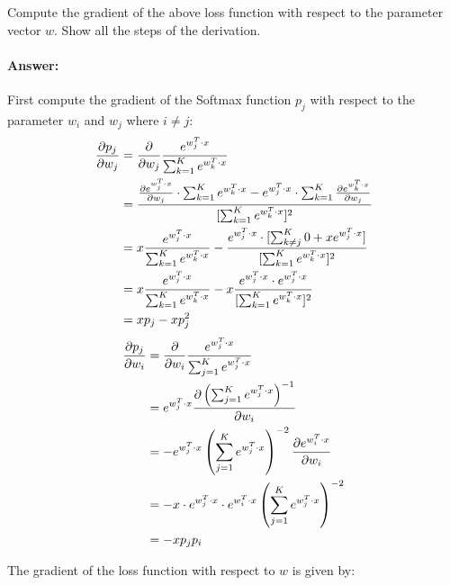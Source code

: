 \documentclass[10pt]{article}
\begin{document}
Compute the gradient of the above loss function with respect to the parameter vector $w$. Show all the steps of the derivation.

\paragraph{Answer:} First compute the gradient of the Softmax function $p_j$ with respect to the parameter $w_i$ and $w_j$ where $i\neq j$:
\begin{align*}
  \pdv{p_j}{w_j} &=\pdv{}{w_j}\frac{e^{w_{j}^{T} \cdot x}}{\sum_{k=1}^{K} e^{w_{k}^{T} \cdot x}}\\
  &=\frac{\pdv{e^{w_{j}^{T} \cdot x}}{w_j}\cdot \sum_{k=1}^{K} e^{w_{k}^{T} \cdot x}-e^{w_{j}^{T} \cdot x} \cdot \sum_{k=1}^{K} \pdv{e^{w_{k}^{T} \cdot x}}{w_j}}{[\sum_{k=1}^{K} e^{w_{k}^{T} \cdot x}]^2}\\
  &=x\frac{e^{w_{j}^{T} \cdot x }}{\sum_{k=1}^{K} e^{w_{k}^{T} \cdot x}}- \frac{e^{w_{j}^{T} \cdot x} \cdot [\sum_{k\neq j}^{K} 0 + x e^{w_{j}^{T} \cdot x }]}{[\sum_{k=1}^{K} e^{w_{k}^{T} \cdot x}]^2}\\
  &=x\frac{e^{w_{j}^{T} \cdot x }}{\sum_{k=1}^{K} e^{w_{k}^{T} \cdot x}}- x \frac{e^{w_{j}^{T} \cdot x} \cdot  e^{w_{j}^{T} \cdot x }}{[\sum_{k=1}^{K} e^{w_{k}^{T} \cdot x}]^2}\\
  &=x p_{j} - x p_j^2\\
\end{align*}
\begin{align*}
  \pdv{p_j}{w_i} &=\pdv{}{w_i}\frac{e^{w_{j}^{T} \cdot x}}{\sum_{j=1}^{K} e^{w_{j}^{T} \cdot x}}\\
  &=e^{w_{j}^{T} \cdot x} \pdv{\left(\sum_{j=1}^{K} e^{w_{j}^{T} \cdot x}\right)^{-1}}{w_i}\\
  &=-e^{w_{j}^{T} \cdot x} \left(\sum_{j=1}^{K} e^{w_{j}^{T} \cdot x}\right)^{-2} \pdv{e^{w_{i}^{T} \cdot x}}{w_i}\\
  &=-x\cdot e^{w_{j}^{T} \cdot x}\cdot e^{w_{i}^{T} \cdot x} \left(\sum_{j=1}^{K} e^{w_{j}^{T} \cdot x}\right)^{-2}\\
  &=-x p_j p_i
\end{align*}

The gradient of the loss function with respect to $w$ is given by:
\end{document}
